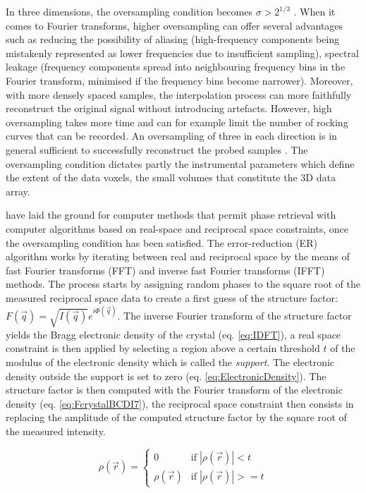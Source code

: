 In three dimensions, the oversampling condition becomes $\sigma>2^{1/3}$ \parencite{Miao1998, Miao2000, miao_possible_2000}.
When it comes to Fourier transforms, higher oversampling can offer several advantages such as reducing the possibility of aliasing (high-frequency components being mistakenly represented as lower frequencies due to insufficient sampling), spectral leakage (frequency components spread into neighbouring frequency bins in the Fourier transform, minimised if the frequency bins become narrower).
Moreover, with more densely spaced samples, the interpolation process can more faithfully reconstruct the original signal without introducing artefacts.
However, high oversampling takes more time and can for example limit the number of rocking curves that can be recorded.
An oversampling of three in each direction is in general sufficient to successfully reconstruct the probed samples \parencite{Dupraz2015}.
The oversampling condition dictates partly the instrumental parameters which define the extent of the data voxels, the small volumes that constitute the 3D data array.

\cite{fienup_reconstruction_1978, Fienup1982, Fienup1986} have laid the ground for computer methods that permit phase retrieval with computer algorithms based on real-space and reciprocal space constraints, once the oversampling condition has been satisfied.
The error-reduction (ER) algorithm works by iterating between real and reciprocal space by the means of fast Fourier transforms (FFT) and inverse fast Fourier transforms (IFFT) methods.
The process starts by assigning random phases to the square root of the measured reciprocal space data to create a first guess of the structure factor: $F(\vec{q}) = \sqrt{I(\vec{q})}e^{i\Phi(\vec{q})}$.
The inverse Fourier transform of the structure factor yields the Bragg electronic density of the crystal (eq. \ref{eq:IDFT}), a real space constraint is then applied by selecting a region above a certain threshold $t$ of the modulus of the electronic density which is called the \textit{support}.
The electronic density outside the support is set to zero (eq. \ref{eq:ElectronicDensity}).
The structure factor is then computed with the Fourier transform of the electronic density (eq. \ref{eq:FcrystalBCDI7}), the reciprocal space constraint then consists in replacing the amplitude of the computed structure factor by the square root of the measured intensity.

\begin{equation}
    \label{eq:ElectronicDensity}
    \rho(\vec{r}) =
        \begin{cases}
            0  & \text{if} \; |\rho(\vec{r})| < t \\
            \rho(\vec{r}) & \text{if}  \; |\rho(\vec{r})| >= t
        \end{cases}
\end{equation}

